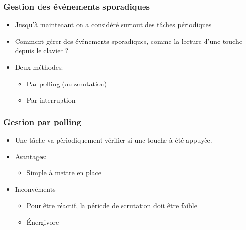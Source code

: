 \documentclass[ignorenonframetext,]{beamer}
\begin{document}
\begin{frame}\frametitle{Gestion des événements sporadiques}

\begin{itemize}
\item
  Jusqu'à maintenant on a considéré surtout des tâches périodiques
\item
  Comment gérer des événements sporadiques, comme la lecture d'une
  touche depuis le clavier ?
\item
  Deux méthodes:

  \begin{itemize}
  \item
    Par polling (ou scrutation)
  \item
    Par interruption
  \end{itemize}
\end{itemize}

\end{frame}

\begin{frame}\frametitle{Gestion par polling}

\begin{itemize}
\item
  Une tâche va périodiquement vérifier si une touche à été appuyée.
\item
  Avantages:

  \begin{itemize}
  \item
    Simple à mettre en place
  \end{itemize}
\item
  Inconvénients

  \begin{itemize}
  \item
    Pour être réactif, la période de scrutation doit être faible
  \item
    Énergivore
  \end{itemize}
\end{itemize}

\end{frame}
\end{document}
